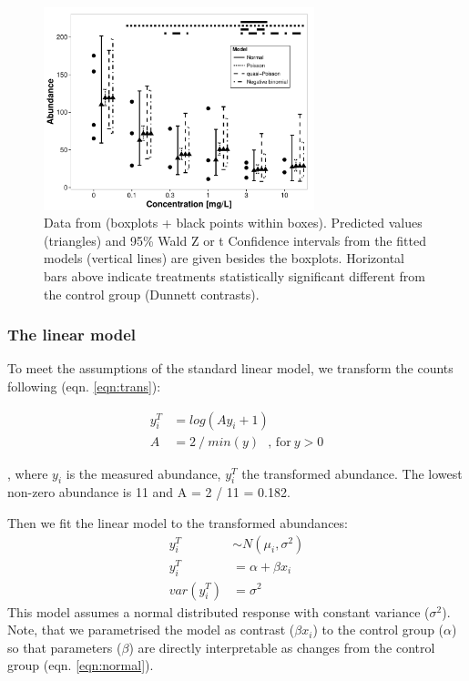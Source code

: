 \documentclass{scrartcl}
\begin{document}
\begin{figure}
  \centering
  \includegraphics[width = 0.7\textwidth]{example.pdf}
  \caption{Data from \citet{brock_minimum_2015} (boxplots + black points within boxes). 
  Predicted values (triangles) and 95\% Wald Z or t Confidence intervals from the fitted models (vertical lines) are given besides the boxplots.
  Horizontal bars above indicate treatments statistically significant different from the control group (Dunnett contrasts).}
  \label{fig:example}
\end{figure}


\subsubsection{The linear model}
To meet the assumptions of the standard linear model, we transform the counts following \citet{van_den_brink_impact_2000} (eqn. \ref{eqn:trans}):

\begin{align}
  y^T_i & = log(Ay_i + 1) \label{eqn:trans} \\
  A & = 2~/~min(y)~~~\text{, for}~ y > 0 \nonumber
\end{align}

, where $y_i$ is the measured abundance, $y_i^T$ the transformed abundance. The lowest non-zero abundance is 11 and  A = 2 / 11 = 0.182.

Then we fit the linear model to the transformed abundances:
\begin{align}
  y_i^T &\sim N(\mu_i, \sigma^2) \nonumber \\
  y_i^T &= \alpha + \beta x_i \label{eqn:normal} \\
  var(y_i^T) &= \sigma^2 \nonumber
\end{align}
This model assumes a normal distributed response with constant variance ($\sigma^2$).
Note, that we parametrised the model as contrast ($\beta x_i$) to the control group ($\alpha$) so that parameters ($\beta$) are directly interpretable as changes from the control group (eqn. \ref{eqn:normal}).
\end{document}
